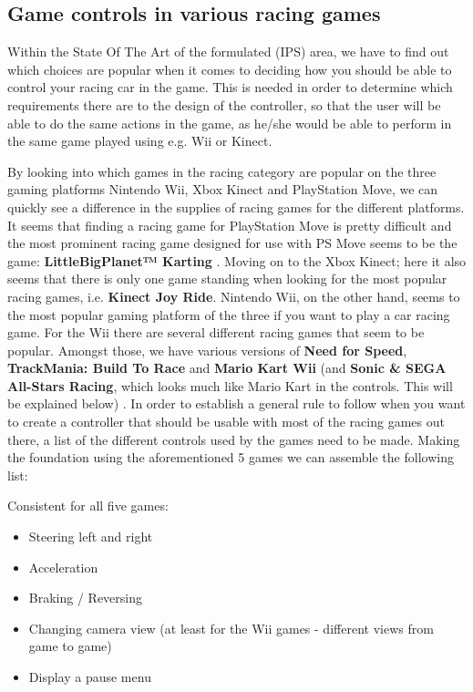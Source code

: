 \subsection{Game controls in various racing games}
Within the State Of The Art of the formulated (IPS) area, we have to find out which choices are popular when it comes to deciding how you should be able to control your racing car in the game. This is needed in order to determine which requirements there are to the design of the controller, so that the user will be able to do the same actions in the game, as he/she would be able to perform in the same game played using e.g. Wii or Kinect.

By looking into which games in the racing category are popular on the three gaming platforms Nintendo Wii, Xbox Kinect and PlayStation Move, we can quickly see a difference in the supplies of racing games for the different platforms. It seems that finding a racing game for PlayStation Move is pretty difficult and the most prominent racing game designed for use with PS Move seems to be the game: \textbf{LittleBigPlanet™ Karting} \parencite{Miller2012}. Moving on to the Xbox Kinect; here it also seems that there is only one game standing when looking for the most popular racing games, i.e. \textbf{Kinect Joy Ride}\parencite{Davidson2010}. Nintendo Wii, on the other hand, seems to the most popular gaming platform of the three if you want to play a car racing game. For the Wii there are several different racing games that seem to be popular. Amongst those, we have various versions of \textbf{Need for Speed}, \textbf{TrackMania: Build To Race} and \textbf{Mario Kart Wii} (and \textbf{Sonic \& SEGA All-Stars Racing}, which looks much like Mario Kart in the controls. This will be explained below) \parencite{Ign2013}.
In order to establish a general rule to follow when you want to create a controller that should be usable with most of the racing games out there, a list of the different controls used by the games need to be made. Making the foundation using the aforementioned 5 games we can assemble the following list:

Consistent for all five games:
\begin{itemize}
\item Steering left and right
\item Acceleration
\item Braking / Reversing
\item Changing camera view (at least for the Wii games - different views from game to game)
\item Display a pause menu
\end{itemize}

